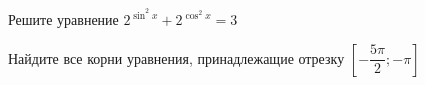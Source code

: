 \begin{ex}
	\begin{condition}
		\begin{enumcols}[label=\asbuk*)]
			\item Решите уравнение \( 2^{\sin^2 x} + 2^{\cos^2 x} =3 \)
			\item Найдите все корни уравнения, принадлежащие отрезку \( \left[-\dfrac{5\pi}{2};-\pi\right] \)
		\end{enumcols}
	\end{condition}
\end{ex}